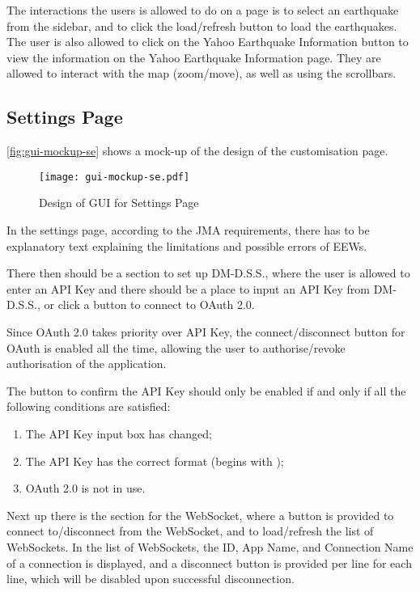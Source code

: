 The interactions the users is allowed to do on a page is to select an earthquake from the sidebar, and to click the load/refresh button to load the earthquakes. The user is also allowed to click on the Yahoo Earthquake Information button to view the information on the Yahoo Earthquake Information page. They are allowed to interact with the map (zoom/move), as well as using the scrollbars.

\subsection{Settings Page}

\autoref{fig:gui-mockup-se} shows a mock-up of the design of the customisation page.

\begin{figure}[htp]
    \centering
    \texttt{[image: gui-mockup-se.pdf]}
    \caption{Design of GUI for Settings Page}
    \label{fig:gui-mockup-se}
\end{figure}

In the settings page, according to the JMA requirements, there has to be explanatory text explaining the limitations and possible errors of EEWs.

There then should be a section to set up DM-D.S.S., where the user is allowed to enter an API Key and there should be a place to input an API Key from DM-D.S.S., or click a button to connect to OAuth 2.0.

Since OAuth 2.0 takes priority over API Key, the connect/disconnect button for OAuth is enabled all the time, allowing the user to authorise/revoke authorisation of the application.

The button to confirm the API Key should only be enabled if and only if all the following conditions are satisfied:
\begin{enumerate}
    \item The API Key input box has changed;
    \item The API Key has the correct format (begins with );
    \item OAuth 2.0 is not in use.
\end{enumerate}

Next up there is the section for the WebSocket, where a button is provided to connect to/disconnect from the WebSocket, and to load/refresh the list of WebSockets. In the list of WebSockets, the ID, App Name, and Connection Name of a connection is displayed, and a disconnect button is provided per line for each line, which will be disabled upon successful disconnection.

